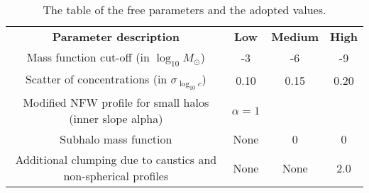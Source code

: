 \begin{table*}
    \begin{tabular}{ c c c c }
    \textbf{Parameter description}  & \textbf{Low} & \textbf{Medium} & \textbf{High} \\
    Mass function cut-off (in $\log_{10}M_\odot$)        & -3 & -6 & -9 \\
    Scatter of concentrations (in $\sigma_{\log_{10}c}$)              & 0.10 & 0.15 & 0.20 \\
    Modified NFW profile for small halos (inner slope alpha) & $\alpha=1$ & \cite{Ishiyama_2014} &  \cite{Ishiyama_2014} \\
    Subhalo mass function & None & 0 & 0 \\
    Additional clumping due to caustics and non-spherical profiles & None & None & 2.0
\\    \end{tabular}
\caption{The table of the free parameters and the adopted values.}
\end{table*}